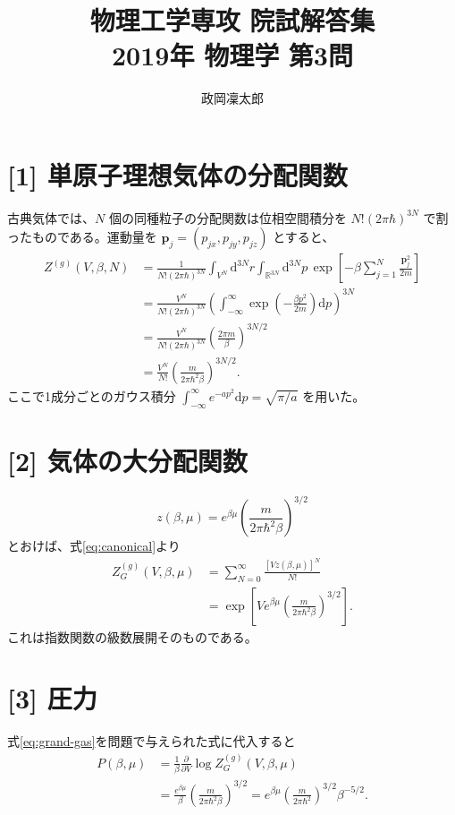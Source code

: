 \documentclass[11pt,a4paper]{article}
\title{物理工学専攻 院試解答集\\2019年 物理学 第3問}
\author{政岡凜太郎}
\date{}
\begin{document}
\maketitle

\section*{[1] 単原子理想気体の分配関数}
古典気体では、$N$ 個の同種粒子の分配関数は位相空間積分を
$N!(2\pi\hbar)^{3N}$ で割ったものである。運動量を
$\boldsymbol{p}_j=(p_{jx},p_{jy},p_{jz})$ とすると、
\begin{align}
 Z^{(g)}(V,\beta,N)
 &=\frac{1}{N!(2\pi\hbar)^{3N}}
   \int_{V^N}\mathrm{d}^{3N}r\int_{\mathbb{R}^{3N}}\mathrm{d}^{3N}p\,
   \exp\!\left[-\beta\sum_{j=1}^{N}\frac{\boldsymbol{p}_j^2}{2m}\right]\\
 &=\frac{V^N}{N!(2\pi\hbar)^{3N}}
   \left(\int_{-\infty}^{\infty}
        \exp\!\left(-\frac{\beta p^2}{2m}\right)\mathrm{d}p\right)^{3N}\\
 &=\frac{V^N}{N!(2\pi\hbar)^{3N}}
   \left(\frac{2\pi m}{\beta}\right)^{3N/2}\\
 &=\frac{V^N}{N!}
   \left(\frac{m}{2\pi\hbar^2\beta}\right)^{3N/2}.
 \label{eq:canonical}
\end{align}
ここで1成分ごとのガウス積分
$\int_{-\infty}^{\infty}e^{-ap^2}\mathrm{d}p=\sqrt{\pi/a}$
を用いた。

\section*{[2] 気体の大分配関数}
\begin{equation}
 z(\beta,\mu)=e^{\beta\mu}
     \left(\frac{m}{2\pi\hbar^2\beta}\right)^{3/2}
\end{equation}
とおけば、式\eqref{eq:canonical}より
\begin{align}
 Z_G^{(g)}(V,\beta,\mu)
 &=\sum_{N=0}^{\infty}\frac{[Vz(\beta,\mu)]^N}{N!}\\
 &=\exp\!\left[V e^{\beta\mu}
        \left(\frac{m}{2\pi\hbar^2\beta}\right)^{3/2}\right].
 \label{eq:grand-gas}
\end{align}
これは指数関数の級数展開そのものである。

\section*{[3] 圧力}
式\eqref{eq:grand-gas}を問題で与えられた式に代入すると
\begin{align}
 P(\beta,\mu)
 &=\frac{1}{\beta}\frac{\partial}{\partial V}
       \log Z_G^{(g)}(V,\beta,\mu)\\
 &=\frac{e^{\beta\mu}}{\beta}
       \left(\frac{m}{2\pi\hbar^2\beta}\right)^{3/2}
 =e^{\beta\mu}\left(\frac{m}{2\pi\hbar^2}\right)^{3/2}\beta^{-5/2}.
 \label{eq:pressure}
\end{align}
\end{document}
